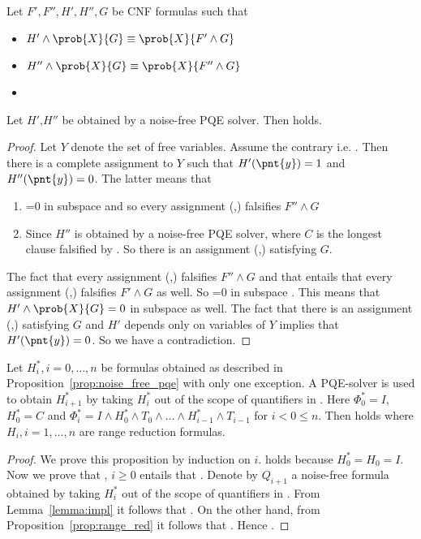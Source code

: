 \begin{lemma}
\label{lemma:impl}
Let $F',F'',H',H'',G$ be  CNF formulas such that
\begin{itemize}
\item $H' \wedge \prob{X}{G} \equiv \prob{X}{F' \wedge G}$
\item $H'' \wedge \prob{X}{G} \equiv \prob{X}{F'' \wedge G}$
\item {}
\end{itemize}
Let $H'$,$H''$ be obtained by a noise-free PQE solver.
Then  holds.
\end{lemma}
\begin{proof}
Let $Y$ denote the set of free variables. Assume the contrary
i.e. .  Then there is a complete assignment  to
$Y$ such that $H'(\pnt{y})=1$ and $H''(\pnt{y})=0$. The latter means
that 
\begin{enumerate}
\item {}=0 in subspace  and so every
assignment (,) falsifies $F'' \wedge G$
\item Since $H''$ is obtained by a noise-free PQE solver,
 where $C$ is the longest clause falsified by .
So there is an assignment (,) satisfying $G$.
\end{enumerate}

The fact that every assignment (,) falsifies $F'' \wedge
G$ and that  entails that every assignment
(,) falsifies $F' \wedge G$ as
well. So =0 in subspace . This means that
$H' \wedge \prob{X}{G} = 0$ in subspace  as well. The fact that
there is an assignment (,) satisfying $G$ and $H'$
depends only on variables of $Y$ implies that $H'(\pnt{y})=0$.
So we have a contradiction.
\end{proof}
\begin{proposition}
Let $H^*_i, i=0,\dots,n$ be formulas obtained as described in
Proposition~\ref{prop:noise_free_pqe} with only one exception. A 
PQE-solver is used to obtain $H^*_{i+1}$ by taking $H^*_i$ out of the
scope of quantifiers in .
Here $\Phi^*_0 = I$, $H^*_0=C$ and $\Phi^*_i = I \wedge H^*_0 \wedge
T_0 \wedge \dots \wedge H^*_{i-1} \wedge T_{i-1}$ for $i < 0 \leq n$.
Then  holds where $H_i,i=1,\dots,n$ are range
reduction formulas.
\end{proposition}
\begin{proof}
We prove this proposition by induction on $i$. 
 holds because $H^*_0 = H_0 = I$.
Now we prove that , $i \geq 0$ entails that
. Denote by $Q_{i+1}$ a noise-free formula
obtained by taking $H^*_i$ out of the scope of quantifiers
in . From
Lemma~\ref{lemma:impl} it follows that . On the
other hand, from Proposition~\ref{prop:range_red} it follows that
. Hence .
\end{proof}

